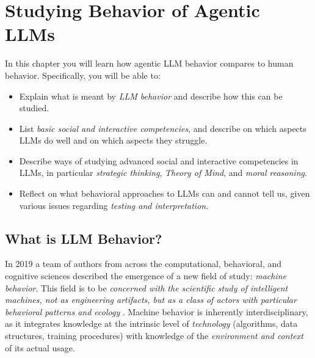

\chapter{Studying Behavior of Agentic LLMs}\label{chap:behavior}

\begin{learningbox}
In this chapter you will learn how agentic LLM behavior compares to human behavior. %
Specifically, you will be able to:
\begin{itemize}[leftmargin=*, nosep]
    \item Explain what is meant by {\em LLM behavior} and describe how this can be studied.
    \item List {\em basic social and interactive competencies}, and describe on which aspects LLMs do well and on which aspects they struggle.
    \item Describe ways of studying advanced social and interactive competencies in LLMs, in particular {\em strategic thinking}, {\em Theory of Mind}, and {\em moral reasoning}.
    \item Reflect on what behavioral approaches to LLMs can and cannot tell us, given various issues regarding {\em testing and interpretation}.
\end{itemize}
\end{learningbox}

\section{What is LLM Behavior?}
In 2019 a team of authors from across the computational, behavioral, and cognitive sciences described %
the emergence of a new field of study: \emph{machine behavior}. This field is to be {\em concerned with the scientific study of intelligent machines, not as engineering artifacts, but as a class of actors with particular behavioral patterns and ecology} \citep{rahwan_machine_2019}. Machine behavior is inherently interdisciplinary, as it integrates knowledge at the intrinsic level 
of  {\em technology} (algorithms, data structures, training procedures) with knowledge of the \emph{environment and context} of its actual usage. 

